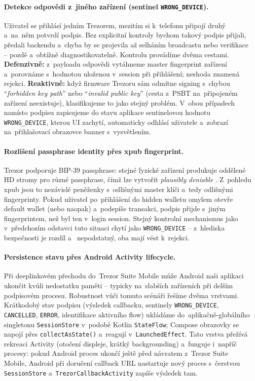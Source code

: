 \paragraph{Detekce odpovědi z~jiného zařízení (sentinel
\texttt{WRONG\_DEVICE}).} Uživatel se přihlásí jedním Trezorem, mezitím
si k~telefonu připojí druhý a~na~něm potvrdí podpis. Bez explicitní
kontroly bychom takový podpis přijali, předali backendu a~chyba by se
projevila až selháním broadcastu nebo verifikace -- pozdě
a~obtížně diagnostikovatelně. Kontrolu provádíme dvěma cestami.
\textbf{Defenzivně:} z~payloadu odpovědi vytáhneme master fingerprint
zařízení a~porovnáme s~hodnotou uloženou v~session při přihlášení;
neshoda znamená rejekci. \textbf{Reaktivně:} když firmware Trezoru sám
odmítne signing s~chybou \enquote{\emph{forbidden key path}} nebo
\enquote{\emph{invalid public key}} (cesta z~PSBT na~připojeném
zařízení neexistuje), klasifikujeme to jako stejný problém. V~obou
případech namísto podpisu zapisujeme do stavu aplikace sentinelovou
hodnotu \texttt{WRONG\_DEVICE}, kterou UI zachytí, automaticky odhlásí
uživatele a~zobrazí na~přihlašovací obrazovce banner s~vysvětlením.

\paragraph{Rozlišení passphrase identity přes xpub fingerprint.}
Trezor podporuje BIP-39 passphrase: stejné fyzické zařízení produkuje
oddělené HD stromy pro různé passphrase, čímž lze vytvořit
\emph{plausibly deniable} . Z~pohledu xpub jsou to
nezávislé peněženky s~odlišnými master klíči a~tedy odlišnými
fingerprinty. Pokud uživatel po~přihlášení do hidden walletu omylem
otevře default wallet (nebo naopak) a~podepíše transakci, podpis přijde
s~jiným fingerprintem, než byl ten v~login session. Stejný kontrolní
mechanismus jako v~předchozím odstavci tuto situaci chytí jako
\texttt{WRONG\_DEVICE} -- z~hlediska bezpečnosti je rozdíl
 a~
nepodstatný, oba mají vést k~rejekci.

\paragraph{Persistence stavu přes Android Activity lifecycle.}
Při deeplinkovém přechodu do~Trezor Suite Mobile může Android naši
aplikaci ukončit kvůli nedostatku paměti -- typicky na~slabších
zařízeních při delším podpisovém procesu. Robustnost vůči tomuto
scénáři řešíme dvěma vrstvami. Krátkodobý stav podpisu (výsledek
callbacku, sentinely \texttt{WRONG\_DEVICE},
\texttt{CANCELLED}, \texttt{ERROR}, identifikace aktivního flow)
ukládáme do~aplikačně-globálního singletonu \texttt{Session\allowbreak Store}
v~podobě Kotlin \texttt{StateFlow}; Compose obrazovky se napojí přes
\texttt{collectAsState()} a~reagují v~\texttt{LaunchedEffect}.
Tato vrstva přežívá rekreaci Activity (otočení displeje, krátký
backgrounding) a~funguje i~napříč procesy: pokud Android proces
ukončí ještě před návratem z~Trezor Suite Mobile, Android při doručení
callback URL nastartuje nový proces s~čerstvou \texttt{Session\allowbreak Store}
a~\texttt{TrezorCallbackActivity} zapíše výsledek tam.

